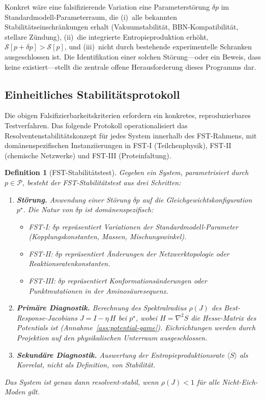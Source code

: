 \documentclass[12pt,a4paper]{article}
\newtheorem{definition}{Definition}
\theoremstyle{remark}
\begin{document}
\noindent Konkret w\"are eine falsifizierende Variation eine Parameterst\"orung $\delta p$ im Standardmodell-Parameterraum, die (i)~alle bekannten Stabilit\"atseinschr\"ankungen erhalt (Vakuumstabilit\"at, BBN-Kompatibilit\"at, stellare Z\"undung), (ii)~die integrierte Entropieproduktion erh\"oht, $\mathcal{S}[p + \delta p] > \mathcal{S}[p]$, und (iii)~nicht durch bestehende experimentelle Schranken ausgeschlossen ist. Die Identifikation einer solchen St\"orung---oder ein Beweis, dass keine existiert---stellt die zentrale offene Herausforderung dieses Programms dar.

\subsection{Einheitliches Stabilit\"atsprotokoll}\label{sec:stability-protocol}

Die obigen Falsifizierbarkeitskriterien erfordern ein konkretes, reproduzierbares
Testverfahren. Das folgende Protokoll operationalisiert das
Resolventenstabilit\"atskonzept f\"ur jedes System innerhalb des
FST-Rahmens, mit dom\"anenspezifischen Instanziierungen in FST-I
(Teilchenphysik), FST-II (chemische Netzwerke) und FST-III
(Proteinfaltung).

\begin{definition}[FST-Stabilit\"atstest]\label{def:stability-test}
Gegeben ein System, parametrisiert durch $p \in \mathcal{P}$, besteht der
\emph{FST-Stabilit\"atstest} aus drei Schritten:
\begin{enumerate}
  \item \textbf{St\"orung.} Anwendung einer St\"orung $\delta p$ auf die
        Gleichgewichtskonfiguration $p^\star$. Die Natur von $\delta p$
        ist dom\"anenspezifisch:
        \begin{itemize}
          \item FST-I: $\delta p$ repr\"asentiert Variationen der
                Standardmodell-Parameter (Kopplungskonstanten, Massen,
                Mischungswinkel).
          \item FST-II: $\delta p$ repr\"asentiert \"Anderungen der
                Netzwerktopologie oder Reaktionsratenkonstanten.
          \item FST-III: $\delta p$ repr\"asentiert Konformations\"anderungen
                oder Punktmutationen in der Aminos\"auresequenz.
        \end{itemize}
  \item \textbf{Prim\"are Diagnostik.} Berechnung des Spektralradius
        $\rho(J)$ des Best-Response-Jacobians
        $J = I - \eta\, H$ bei $p^\star$, wobei $H = \nabla^2 S$ die
        Hesse-Matrix des Potentials ist
        (Annahme~\ref{ass:potential-game}). Eichrichtungen werden durch
        Projektion auf den physikalischen Unterraum ausgeschlossen.
  \item \textbf{Sekund\"are Diagnostik.} Auswertung der
        Entropieproduktionsrate $\langle\dot{S}\rangle$ als
        \emph{Korrelat}, nicht als Definition, von Stabilit\"at.
\end{enumerate}
Das System ist genau dann \emph{resolvent-stabil}, wenn $\rho(J) < 1$
f\"ur alle Nicht-Eich-Moden gilt.
\end{definition}
\end{document}
